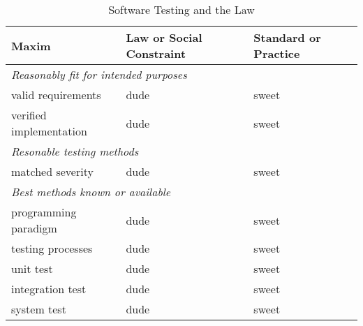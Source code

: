 \begin{center}
\begin{table}
\caption{Software Testing and the Law}
\begin{tabular}{|p{1in}|p{2.5in}|p{2.5in}|}
\hline
\textbf{Maxim} & \textbf{Law or Social Constraint} & \textbf{Standard or Practice} \\[3pt]
\hline
\multicolumn{3}{|l|}{\textit{Reasonably fit for intended purposes}} \\
\hline
valid requirements & dude & sweet \\
verified implementation & dude & sweet \\
\hline
\multicolumn{3}{|l|}{\textit{Resonable testing methods}} \\
\hline
matched severity & dude & sweet \\
\hline
\multicolumn{3}{|l|}{\textit{Best methods known or available}} \\
\hline
programming paradigm & dude & sweet \\
testing processes & dude & sweet \\
unit test & dude & sweet \\
integration test & dude & sweet \\
system test & dude & sweet \\
\hline
\end{tabular}
\label{table2}
\end{table}
\end{center}